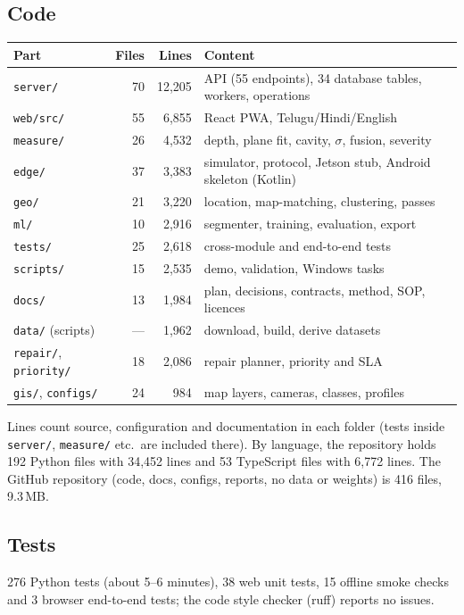 \documentclass[11pt,a4paper]{article}
\newcommand{\code}[1]{\texttt{\small #1}}
\begin{document}
\subsection{Code}
\begin{center}
\small
\begin{tabular}{@{}l r r l@{}}
\toprule
\textbf{Part} & \textbf{Files} & \textbf{Lines} & \textbf{Content}\\
\midrule
\code{server/} & 70 & 12,205 & API (55 endpoints), 34 database tables, workers, operations\\
\code{web/src/} & 55 & 6,855 & React PWA, Telugu/Hindi/English\\
\code{measure/} & 26 & 4,532 & depth, plane fit, cavity, $\sigma$, fusion, severity\\
\code{edge/} & 37 & 3,383 & simulator, protocol, Jetson stub, Android skeleton (Kotlin)\\
\code{geo/} & 21 & 3,220 & location, map-matching, clustering, passes\\
\code{ml/} & 10 & 2,916 & segmenter, training, evaluation, export\\
\code{tests/} & 25 & 2,618 & cross-module and end-to-end tests\\
\code{scripts/} & 15 & 2,535 & demo, validation, Windows tasks\\
\code{docs/} & 13 & 1,984 & plan, decisions, contracts, method, SOP, licences\\
\code{data/} (scripts) & --- & 1,962 & download, build, derive datasets\\
\code{repair/}, \code{priority/} & 18 & 2,086 & repair planner, priority and SLA\\
\code{gis/}, \code{configs/} & 24 & 984 & map layers, cameras, classes, profiles\\
\bottomrule
\end{tabular}
\end{center}
Lines count source, configuration and documentation in each folder (tests inside \code{server/}, \code{measure/} etc.\
are included there). By language, the repository holds 192 Python files with 34,452 lines and 53 TypeScript files with
6,772 lines. The GitHub repository (code, docs, configs, reports, no data or weights) is 416 files, 9.3\,MB.

\subsection{Tests}
276 Python tests (about 5--6 minutes), 38 web unit tests, 15 offline smoke checks and 3 browser end-to-end tests; the
code style checker (ruff) reports no issues.
\end{document}
